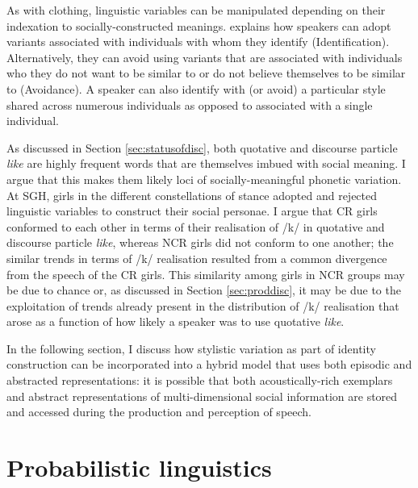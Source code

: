As with clothing, linguistic variables can be manipulated depending on their indexation to socially-constructed meanings.    explains how speakers can adopt variants associated with individuals with whom they identify (Identification).  Alternatively, they can avoid using variants that are associated with individuals who they do not want to be similar to or do not believe themselves to be similar to (Avoidance).  A speaker can also identify with (or avoid) a particular style shared across numerous individuals as opposed to associated with a single individual.

As discussed in Section \ref{sec:statusofdisc}, both quotative and discourse particle \textit{like} are highly frequent words that are themselves imbued with social meaning.  I argue that this makes them likely loci of socially-meaningful phonetic variation.  At SGH, girls in the different constellations of stance adopted and rejected linguistic variables to construct their social personae.  I argue that CR girls conformed to each other in terms of their realisation of /k/ in quotative and discourse particle \textit{like}, whereas NCR girls did not conform to one another; the similar trends in terms of /k/ realisation resulted from a common divergence from the speech of the CR girls.  This similarity among girls in NCR groups may be due to chance or, as discussed in Section \ref{sec:proddisc}, it may be due to the exploitation of trends already present in the distribution of /k/ realisation that arose as a function of how likely a speaker was to use quotative \textit{like}.  

In the following section, I discuss how stylistic variation as part of identity construction can be incorporated into a hybrid model that uses both episodic and abstracted representations:  it is possible that both acoustically-rich exemplars and abstract representations of multi-dimensional social information are stored and accessed during the production and perception of speech.

\section{Probabilistic linguistics}


